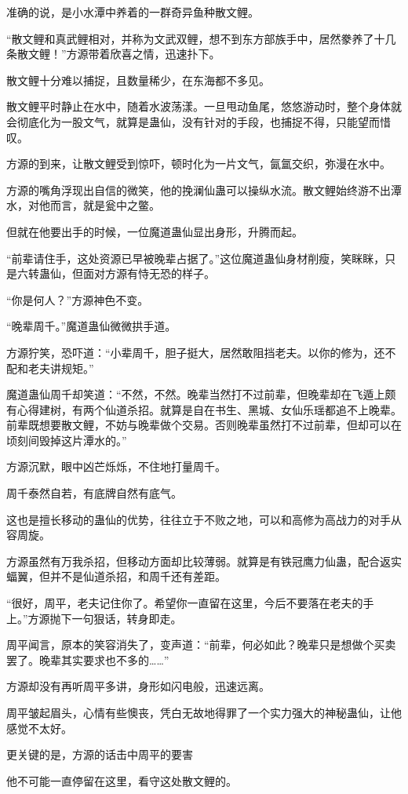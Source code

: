 \begin{this_body}
准确的说，是小水潭中养着的一群奇异鱼种散文鲤。

“散文鲤和真武鲤相对，并称为文武双鲤，想不到东方部族手中，居然豢养了十几条散文鲤！”方源带着欣喜之情，迅速扑下。

散文鲤十分难以捕捉，且数量稀少，在东海都不多见。

散文鲤平时静止在水中，随着水波荡漾。一旦甩动鱼尾，悠悠游动时，整个身体就会彻底化为一股文气，就算是蛊仙，没有针对的手段，也捕捉不得，只能望而惜叹。

方源的到来，让散文鲤受到惊吓，顿时化为一片文气，氤氲交织，弥漫在水中。

方源的嘴角浮现出自信的微笑，他的挽澜仙蛊可以操纵水流。散文鲤始终游不出潭水，对他而言，就是瓮中之鳖。

但就在他要出手的时候，一位魔道蛊仙显出身形，升腾而起。

“前辈请住手，这处资源已早被晚辈占据了。”这位魔道蛊仙身材削瘦，笑眯眯，只是六转蛊仙，但面对方源有恃无恐的样子。

“你是何人？”方源神色不变。

“晚辈周千。”魔道蛊仙微微拱手道。

方源狞笑，恐吓道：“小辈周千，胆子挺大，居然敢阻挡老夫。以你的修为，还不配和老夫讲规矩。”

魔道蛊仙周千却笑道：“不然，不然。晚辈当然打不过前辈，但晚辈却在飞遁上颇有心得建树，有两个仙道杀招。就算是自在书生、黑城、女仙乐瑶都追不上晚辈。前辈既想要散文鲤，不妨与晚辈做个交易。否则晚辈虽然打不过前辈，但却可以在顷刻间毁掉这片潭水的。”

方源沉默，眼中凶芒烁烁，不住地打量周千。

周千泰然自若，有底牌自然有底气。

这也是擅长移动的蛊仙的优势，往往立于不败之地，可以和高修为高战力的对手从容周旋。

方源虽然有万我杀招，但移动方面却比较薄弱。就算是有铁冠鹰力仙蛊，配合返实蝠翼，但并不是仙道杀招，和周千还有差距。

“很好，周平，老夫记住你了。希望你一直留在这里，今后不要落在老夫的手上。”方源抛下一句狠话，转身即走。

周平闻言，原本的笑容消失了，变声道：“前辈，何必如此？晚辈只是想做个买卖罢了。晚辈其实要求也不多的……”

方源却没有再听周平多讲，身形如闪电般，迅速远离。

周平皱起眉头，心情有些懊丧，凭白无故地得罪了一个实力强大的神秘蛊仙，让他感觉不太好。

更关键的是，方源的话击中周平的要害

他不可能一直停留在这里，看守这处散文鲤的。


\end{this_body}
